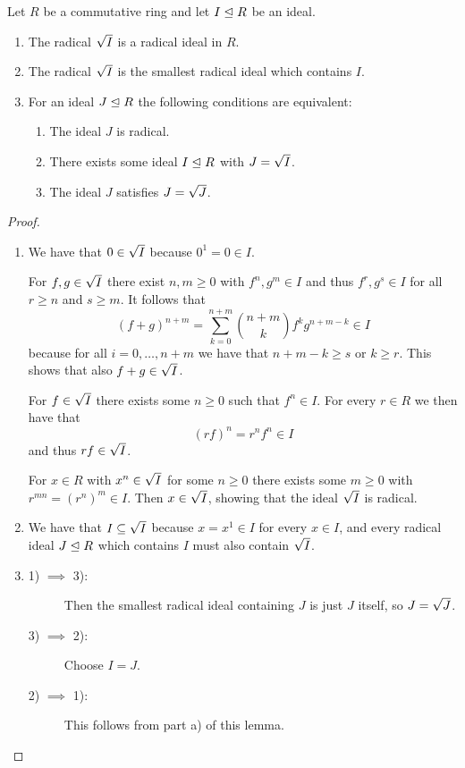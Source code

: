 \begin{lemma}
  Let $R$ be a commutative ring and let $I \trianglelefteq R$ be an ideal. 
  \begin{enumerate}
    \item
      The radical $\sqrt{I}$ is a radical ideal in $R$.
    \item
      The radical $\sqrt{I}$ is the smallest radical ideal which contains $I$.
    \item
      For an ideal $J \trianglelefteq R$ the following conditions are equivalent:
      \begin{enumerate}
        \item
          The ideal $J$ is radical.
        \item
          There exists some ideal $I \trianglelefteq R$ with $J = \sqrt{I}$.
        \item
          The ideal $J$ satisfies $J = \sqrt{J}$.
      \end{enumerate}
  \end{enumerate}
\end{lemma}
\begin{proof}
    \leavevmode
  \begin{enumerate}
    \item
      We have that $0 \in \sqrt{I}$ because $0^1 = 0 \in I$.
      
      For $f, g \in \sqrt{I}$ there exist $n, m \geq 0$ with $f^n, g^m \in I$ and thus $f^r, g^s \in I$ for all $r \geq n$ and $s \geq m$.
      It follows that
      \[
            (f + g)^{n+m}
        =   \sum_{k=0}^{n+m} \binom{n+m}{k} f^k g^{n+m-k}
        \in I
      \]
      because for all $i = 0, \dotsc, n+m$ we have that $n+m-k \geq s$ or $k \geq r$.
      This shows that also $f + g \in \sqrt{I}$.
      
      For $f \in \sqrt{I}$ there exists some $n \geq 0$ such that $f^n \in I$.
      For every $r \in R$ we then have that
      \[
            (rf)^n
        =   r^n f^n
        \in I
      \]
      and thus $rf \in \sqrt{I}$.
      
      For $x \in R$ with $x^n \in \sqrt{I}$ for some $n \geq 0$ there exists some $m \geq 0$ with $r^{mn} = (r^n)^m \in I$.
      Then $x \in \sqrt{I}$, showing that the ideal $\sqrt{I}$ is radical.
    \item
      We have that $I \subseteq \sqrt{I}$ because $x = x^1 \in I$ for every $x \in I$, and every radical ideal $J \trianglelefteq R$ which contains $I$ must also contain $\sqrt{I}$.
    \item
      \begin{description}
        \item[1) $\implies$ 3):]
          Then the smallest radical ideal containing $J$ is just $J$ itself, so $J = \sqrt{J}$.
        \item[3) $\implies$ 2):]
          Choose $I = J$.
        \item[2) $\implies$ 1):]
          This follows from part a) of this lemma.
        \qedhere
      \end{description}
  \end{enumerate}
\end{proof}


